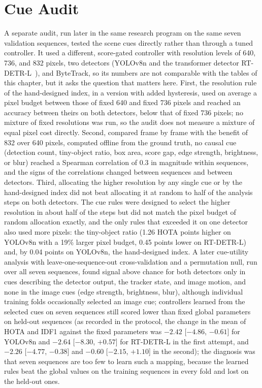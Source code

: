 \section{Cue Audit}\label{sec:ch4-cueaudit}
A separate audit, run later in the same research program on the same seven validation sequences, tested the scene cues directly rather than through a tuned controller. It used a different, score-gated controller with resolution levels of 640, 736, and 832 pixels, two detectors (YOLOv8n and the transformer detector RT-DETR-L~\cite{zhao2024rtdetr}), and ByteTrack, so its numbers are not comparable with the tables of this chapter, but it asks the question that matters here. First, the resolution rule of the hand-designed index, in a version with added hysteresis, used on average a pixel budget between those of fixed 640 and fixed 736 pixels and reached an accuracy between theirs on both detectors, below that of fixed 736 pixels; no mixture of fixed resolutions was run, so the audit does not measure a mixture of equal pixel cost directly. Second, compared frame by frame with the benefit of 832 over 640 pixels, computed offline from the ground truth, no causal cue (detection count, tiny-object ratio, box area, score gap, edge strength, brightness, or blur) reached a Spearman correlation of 0.3 in magnitude within sequences, and the signs of the correlations changed between sequences and between detectors. Third, allocating the higher resolution by any single cue or by the hand-designed index did not beat allocating it at random to half of the analysis steps on both detectors. The cue rules were designed to select the higher resolution in about half of the steps but did not match the pixel budget of random allocation exactly, and the only rules that exceeded it on one detector also used more pixels: the tiny-object ratio (1.26 HOTA points higher on YOLOv8n with a 19\% larger pixel budget, 0.45 points lower on RT-DETR-L) and, by 0.04 points on YOLOv8n, the hand-designed index. A later cue-utility analysis with leave-one-sequence-out cross-validation and a permutation null, run over all seven sequences, found signal above chance for both detectors only in cues describing the detector output, the tracker state, and image motion, and none in the image cues (edge strength, brightness, blur), although individual training folds occasionally selected an image cue; controllers learned from the selected cues on seven sequences still scored lower than fixed global parameters on held-out sequences (as recorded in the protocol, the change in the mean of HOTA and IDF1 against the fixed parameters was $-2.42$ [$-4.86$, $-0.61$] for YOLOv8n and $-2.64$ [$-8.30$, $+0.57$] for RT-DETR-L in the first attempt, and $-2.26$ [$-4.77$, $-0.38$] and $-0.60$ [$-2.15$, $+1.10$] in the second); the diagnosis was that seven sequences are too few to learn such a mapping, because the learned rules beat the global values on the training sequences in every fold and lost on the held-out ones.

